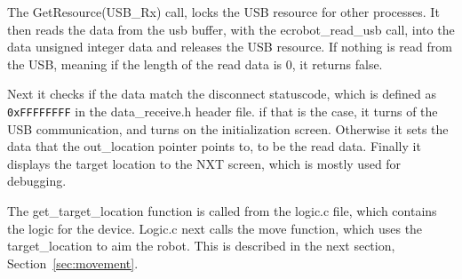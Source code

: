 The GetResource(USB\_Rx) call, locks the USB resource for other processes.
It then reads the data from the usb buffer, with the ecrobot\_read\_usb call, into the data unsigned integer data and releases the USB resource.
If nothing is read from the USB, meaning if the length of the read data is $0$, it returns false.

Next it checks if the data match the disconnect statuscode, which is defined as \texttt{0xFFFFFFFF} in the data\_receive.h header file.
if that is the case, it turns of the USB communication, and turns on the initialization screen.
Otherwise it sets the data that the out\_location pointer points to, to be the read data.
Finally it displays the target location to the NXT screen, which is mostly used for debugging.

The get\_target\_location function is called from the logic.c file, which contains the logic for the device.
Logic.c next calls the move function, which uses the target\_location to aim the robot.
This is described in the next section, Section~\ref{sec:movement}.
